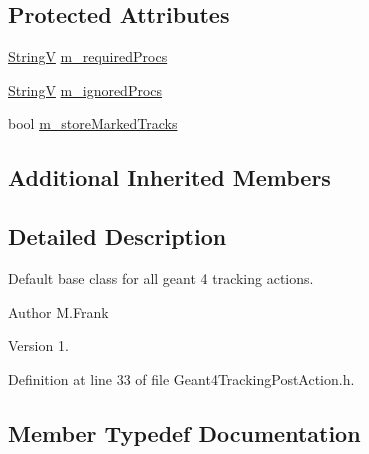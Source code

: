 \subsection*{Protected Attributes}
\begin{DoxyCompactItemize}
\item 
\hyperlink{class_d_d4hep_1_1_simulation_1_1_geant4_tracking_post_action_ae14809326747530052282a63ea5a362d}{StringV} \hyperlink{class_d_d4hep_1_1_simulation_1_1_geant4_tracking_post_action_a1194a1813aee919384ae90d6672d98c5}{m\+\_\+required\+Procs}
\item 
\hyperlink{class_d_d4hep_1_1_simulation_1_1_geant4_tracking_post_action_ae14809326747530052282a63ea5a362d}{StringV} \hyperlink{class_d_d4hep_1_1_simulation_1_1_geant4_tracking_post_action_abf458624a8077fc4533d3c830b9e240f}{m\+\_\+ignored\+Procs}
\item 
bool \hyperlink{class_d_d4hep_1_1_simulation_1_1_geant4_tracking_post_action_a917619b10aa1e34636fb7fe49ad5575e}{m\+\_\+store\+Marked\+Tracks}
\end{DoxyCompactItemize}
\subsection*{Additional Inherited Members}


\subsection{Detailed Description}
Default base class for all geant 4 tracking actions. 

\begin{DoxyAuthor}{Author}
M.\+Frank 
\end{DoxyAuthor}
\begin{DoxyVersion}{Version}
1. 
\end{DoxyVersion}


Definition at line 33 of file Geant4\+Tracking\+Post\+Action.\+h.



\subsection{Member Typedef Documentation}
\hypertarget{class_d_d4hep_1_1_simulation_1_1_geant4_tracking_post_action_ae14809326747530052282a63ea5a362d}{}\label{class_d_d4hep_1_1_simulation_1_1_geant4_tracking_post_action_ae14809326747530052282a63ea5a362d} 
